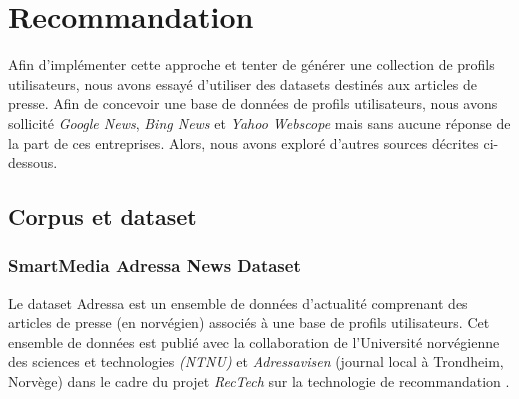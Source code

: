 \newpage
\section{Recommandation}

Afin d'implémenter cette approche et tenter de générer une collection de profils utilisateurs, nous avons essayé d'utiliser des datasets destinés aux articles de presse. Afin de concevoir une base de données de profils utilisateurs, nous avons sollicité \emph{Google News}, \emph{Bing News} et \emph{Yahoo Webscope} \cite{bibid} mais sans aucune réponse de la part de ces entreprises. Alors, nous avons exploré d'autres sources décrites ci-dessous.

\subsection{Corpus et dataset}
    \subsubsection{SmartMedia Adressa News Dataset}
    Le dataset Adressa est un ensemble de données d'actualité comprenant des articles de presse (en norvégien) associés à une base de profils utilisateurs. Cet ensemble de données est publié avec la collaboration de l'Université norvégienne des sciences et technologies \emph{(NTNU)} et \emph{Adressavisen} (journal local à Trondheim, Norvège) dans le cadre du projet \emph{RecTech} sur la technologie de recommandation \cite{refnorvege}.

